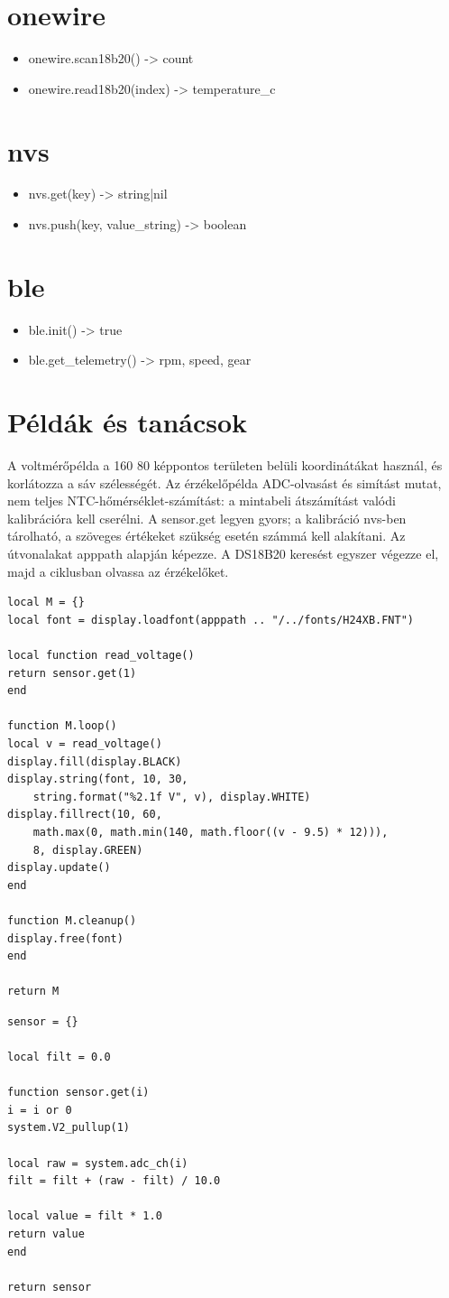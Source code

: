 \section{onewire}
\begin{itemize}
\item onewire.scan18b20() -> count
\item onewire.read18b20(index) -> temperature\_c
\end{itemize}
\section{nvs}
\begin{itemize}
\item nvs.get(key) -> string|nil
\item nvs.push(key, value\_string) -> boolean
\end{itemize}
\section{ble}
\begin{itemize}
\item ble.init() -> true
\item ble.get\_telemetry() -> rpm, speed, gear
\end{itemize}
\section{Példák és tanácsok}
A voltmérőpélda a 160\,\texttimes\,80 képpontos területen belüli koordinátákat használ, és korlátozza a sáv szélességét. Az érzékelőpélda ADC-olvasást és simítást mutat, nem teljes NTC-hőmérséklet-számítást: a mintabeli átszámítást valódi kalibrációra kell cserélni. A sensor.get legyen gyors; a kalibráció nvs-ben tárolható, a szöveges értékeket szükség esetén számmá kell alakítani. Az útvonalakat apppath alapján képezze. A DS18B20 keresést egyszer végezze el, majd a ciklusban olvassa az érzékelőket.
\begin{verbatim}
local M = {}
local font = display.loadfont(apppath .. "/../fonts/H24XB.FNT")

local function read_voltage()
return sensor.get(1)
end

function M.loop()
local v = read_voltage()
display.fill(display.BLACK)
display.string(font, 10, 30,
    string.format("%2.1f V", v), display.WHITE)
display.fillrect(10, 60,
    math.max(0, math.min(140, math.floor((v - 9.5) * 12))),
    8, display.GREEN)
display.update()
end

function M.cleanup()
display.free(font)
end

return M
\end{verbatim}
\begin{verbatim}
sensor = {}

local filt = 0.0

function sensor.get(i)
i = i or 0
system.V2_pullup(1)

local raw = system.adc_ch(i)
filt = filt + (raw - filt) / 10.0

local value = filt * 1.0
return value
end

return sensor
\end{verbatim}
